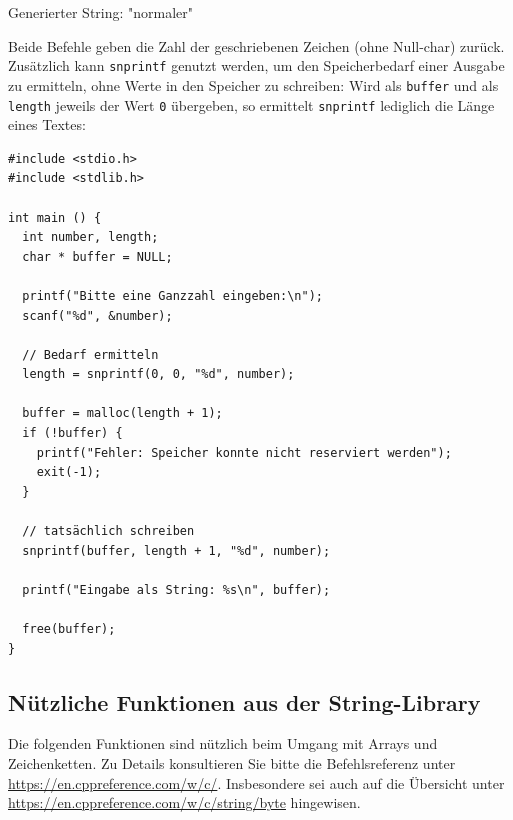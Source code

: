 \begin{cmdbox}
Generierter String: "normaler"
\end{cmdbox}

Beide Befehle geben die Zahl der geschriebenen Zeichen (ohne Null-char) zurück. Zusätzlich kann \texttt{snprintf} genutzt werden, um den Speicherbedarf einer Ausgabe zu ermitteln, ohne Werte in den Speicher zu schreiben: Wird als \texttt{buffer} und als \texttt{length} jeweils der Wert \texttt{0} übergeben, so ermittelt \texttt{snprintf} lediglich die Länge eines Textes:

\begin{codebox}
\begin{verbatim}
#include <stdio.h>
#include <stdlib.h>

int main () {
  int number, length;
  char * buffer = NULL;

  printf("Bitte eine Ganzzahl eingeben:\n");
  scanf("%d", &number);

  // Bedarf ermitteln
  length = snprintf(0, 0, "%d", number);

  buffer = malloc(length + 1);
  if (!buffer) {
    printf("Fehler: Speicher konnte nicht reserviert werden");
    exit(-1);
  }

  // tatsächlich schreiben
  snprintf(buffer, length + 1, "%d", number);

  printf("Eingabe als String: %s\n", buffer);

  free(buffer);
}
\end{verbatim}
\end{codebox}

\subsection{Nützliche Funktionen aus der String-Library}
Die folgenden Funktionen sind nützlich beim Umgang mit Arrays und Zeichenketten. Zu Details konsultieren Sie bitte die Befehlsreferenz unter \url{https://en.cppreference.com/w/c/}. Insbesondere sei auch auf die Übersicht unter \url{https://en.cppreference.com/w/c/string/byte} hingewisen.

